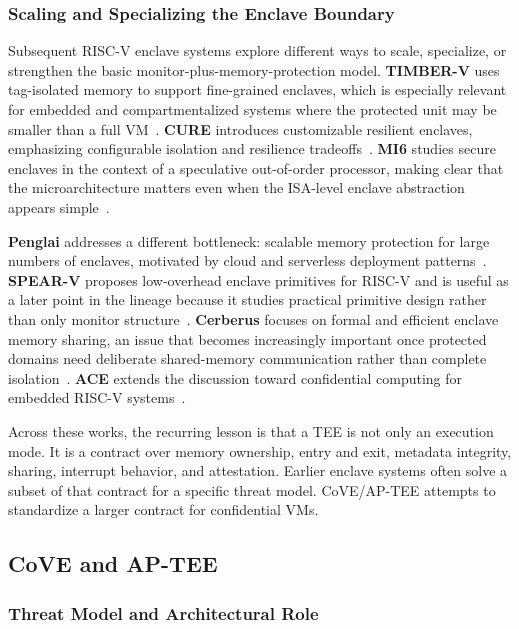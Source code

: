 \subsubsection{Scaling and Specializing the Enclave Boundary}

Subsequent RISC-V enclave systems explore different ways to scale, specialize,
or strengthen the basic monitor-plus-memory-protection model. \textbf{TIMBER-V}
uses tag-isolated memory to support fine-grained enclaves, which is especially
relevant for embedded and compartmentalized systems where the protected unit may
be smaller than a full VM~\cite{weiser2019timberv}. \textbf{CURE} introduces
customizable resilient enclaves, emphasizing configurable isolation and
resilience tradeoffs~\cite{bahmani2021cure}. \textbf{MI6} studies secure
enclaves in the context of a speculative out-of-order processor, making clear
that the microarchitecture matters even when the ISA-level enclave abstraction
appears simple~\cite{bourgeat2019mi6}.

\textbf{Penglai} addresses a different bottleneck: scalable memory protection
for large numbers of enclaves, motivated by cloud and serverless deployment
patterns~\cite{feng2021penglai}. \textbf{SPEAR-V} proposes low-overhead
enclave primitives for RISC-V and is useful as a later point in the lineage
because it studies practical primitive design rather than only monitor
structure~\cite{schrammel2023spearv}. \textbf{Cerberus} focuses on formal and
efficient enclave memory sharing, an issue that becomes increasingly important
once protected domains need deliberate shared-memory communication rather than
complete isolation~\cite{lee2022cerberus}. \textbf{ACE} extends the discussion
toward confidential computing for embedded RISC-V systems~\cite{ozga2025ace}.

Across these works, the recurring lesson is that a TEE is not only an execution
mode. It is a contract over memory ownership, entry and exit, metadata
integrity, sharing, interrupt behavior, and attestation. Earlier enclave
systems often solve a subset of that contract for a specific threat model.
CoVE/AP-TEE attempts to standardize a larger contract for confidential VMs.

\subsection{CoVE and AP-TEE}

\subsubsection{Threat Model and Architectural Role}

